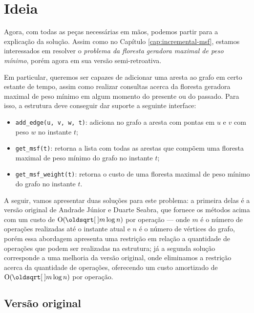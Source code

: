 \section{Ideia}
\label{sec:rmsf-ideia}

Agora, com todas as peças necessárias em mãos, podemos partir para a explicação da solução. Assim como no Capítulo \ref{cap:incremental-msf}, estamos interessados em resolver o \emph{problema da floresta geradora maximal de peso mínimo}, porém agora em sua versão semi-retroativa.

Em particular, queremos ser capazes de adicionar uma aresta ao grafo em certo estante de tempo, assim como realizar consultas acerca da floresta geradora maximal de peso mínimo em algum momento do presente ou do passado. Para isso, a estrutura deve conseguir dar suporte a seguinte interface:

\begin{itemize}
    \item \texttt{add\_edge(u, v, w, t)}: adiciona no grafo a aresta com pontas em $u$ e $v$ com peso $w$ no instante $t$;
    \item \texttt{get\_msf(t)}: retorna a lista com todas as arestas que compõem uma floresta maximal de peso mínimo do grafo no instante $t$;
    \item \texttt{get\_msf\_weight(t)}: retorna o custo de uma floresta maximal de peso mínimo do grafo no instante $t$.
\end{itemize}

A seguir, vamos apresentar duas soluções para este problema: a primeira delas é a versão original de Andrade Júnior e Duarte Seabra, que fornece os métodos acima com um custo de $\Oh(\sqrt{m} \log n)$ por operação --- onde $m$ é o número de operações realizadas até o instante atual e $n$ é o número de vértices do grafo, porém essa abordagem apresenta uma restrição em relação a quantidade de operações que podem ser realizadas na estrutura; já a segunda solução corresponde a uma melhoria da versão original, onde eliminamos a restrição acerca da quantidade de operações, oferecendo um custo amortizado de $\Oh(\sqrt{m} \log n)$ por operação.

\subsection{Versão original}
\label{sec:rmsf-versao-ori}


